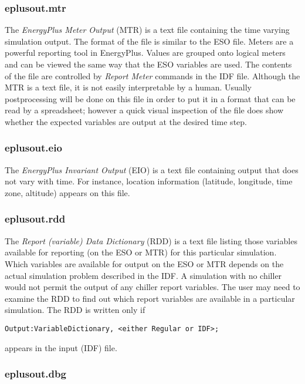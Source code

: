 \subsubsection{eplusout.mtr}\label{eplusout.mtr}

The \emph{EnergyPlus Meter Output} (MTR) is a text file containing the time varying simulation output. The format of the file is similar to the ESO file. Meters are a powerful reporting tool in EnergyPlus. Values are grouped onto logical meters and can be viewed the same way that the ESO variables are used. The contents of the file are controlled by \emph{Report Meter} commands in the IDF file. Although the MTR is a text file, it is not easily interpretable by a human. Usually postprocessing will be done on this file in order to put it in a format that can be read by a spreadsheet; however a quick visual inspection of the file does show whether the expected variables are output at the desired time step.

\subsubsection{eplusout.eio}\label{eplusout.eio}

The \emph{EnergyPlus Invariant Output} (EIO) is a text file containing output that does not vary with time. For instance, location information (latitude, longitude, time zone, altitude) appears on this file.

\subsubsection{eplusout.rdd}\label{eplusout.rdd}

The \emph{Report (variable) Data Dictionary} (RDD) is a text file listing those variables available for reporting (on the ESO or MTR) for this particular simulation. Which variables are available for output on the ESO or MTR depends on the actual simulation problem described in the IDF. A simulation with no chiller would not permit the output of any chiller report variables. The user may need to examine the RDD to find out which report variables are available in a particular simulation. The RDD is written only if

\begin{lstlisting}
Output:VariableDictionary, <either Regular or IDF>;
\end{lstlisting}

appears in the input (IDF) file.

\subsubsection{eplusout.dbg}\label{eplusout.dbg}

